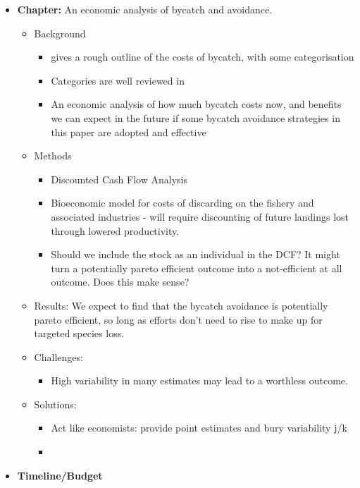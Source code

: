 \documentclass{article}
\newcommand{\sj}[1]{{\color{red}\mbox{}\marginpar{\raggedleft\hspace{0pt}*} #1}}
\begin{document}
\begin{itemize}
\begin{itemize}
    \end{itemize}
  \item {\bf Chapter:} An economic analysis of bycatch and avoidance.
    \begin{itemize}
      \item Background
        \begin{itemize}
          \item \citet{pascoe1997bycatch} gives a rough outline of the costs of bycatch, with some categorisation
          \item Categories are well reviewed in \citet{hall2005managing}
          \item An economic analysis of how much bycatch costs now, and benefits we can expect in the future if some bycatch avoidance strategies in this paper are adopted and effective
        \end{itemize}
      \item Methods
        \begin{itemize}
          \item Discounted Cash Flow Analysis
          \item Bioeconomic model for costs of discarding on the fishery and associated industries - will require discounting of future landings lost through lowered productivity.
          \item Should we include the stock as an individual in the DCF? It might turn a potentially pareto efficient outcome into a not-efficient at all outcome. \sj{Does this make sense?}
        \end{itemize}
      \item Results: We expect to find that the bycatch avoidance is potentially pareto efficient, so long as efforts don't need to rise to make up for targeted species loss.
      \item Challenges:
        \begin{itemize}
          \item High variability in many estimates may lead to a worthless outcome.
        \end{itemize}
      \item Solutions:
        \begin{itemize}
          \item Act like economists: provide point estimates and bury variability \sj{j/k}
          \item 
        \end{itemize}
    \end{itemize}
  \item {\bf Timeline/Budget}

\end{itemize}
\end{document}
